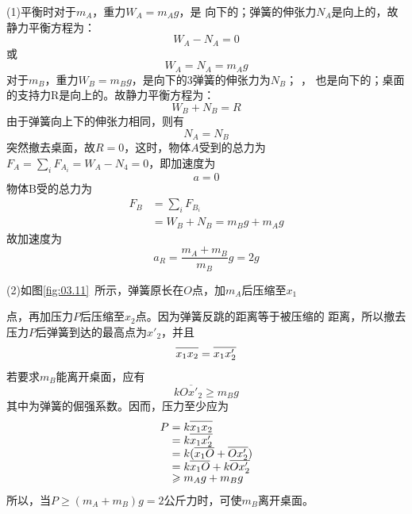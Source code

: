 \solution (1)平衡时对于$ m_A $，重力$ W _ { A } = m _ { A } g $，是
向下的；弹簧的伸张力$ N _ { A } $是向上的，故静力平衡方程为：\vspace{-0.5em}
\begin{equation*}
	W _ { A } - N _ { A } = 0
\end{equation*}
或\vspace{-1.56em}
\begin{equation*}
	W _ { A } = N _ { A } = m _ { A } g
\end{equation*}
对于$ m_B $，重力$ W _ { B } = m _ { B } g $，是向下的3弹簧的伸张力为$ N _ { B } $； ，
也是向下的；桌面的支持力R是向上的。故静力平衡方程为：
\begin{equation*}
	W _ { B } + N _ { B } = R
\end{equation*}
由于弹簧向上下的伸张力相同，则有
\begin{equation*}
	N _ { A } = N _ { B }
\end{equation*}
突然撤去桌面，故$  R = 0  $，这时，物体$ A $受到的总力为$  F _ { A } =
\sum _ i F _ { A _ i } = W _ { A } - N _ { 4 } = 0  $，即加速度为
\begin{equation*}
	a = 0
\end{equation*}
物体B受的总力为
\begin{align*}
	F _ { B } &= \sum _ i F _ { B _ i } \\
		&= W _ { B } + N _ { B } = m _ { B } g + m _ { A } g
\end{align*}
故加速度为
\begin{equation*}
	a _ { R } = \frac { m _ { A } + m _ { B } } { m _ { B } } g = 2 g
\end{equation*}

(2)如图\ref{fig:03.11}~所示，弹簧原长在$ O $点，加$ m_{A} $后压缩至$ x_{1} $

\noindent 点，再加压力$ P $后压缩至$ x_{2} $点。因为弹簧反跳的距离等于被压缩的
距离，所以撤去压力$ P $后弹簧到达的最高点为$  x'_ { 2 }  $，并且
\begin{equation*}
	\overline{ x _ { 1 } x _ { 2 } \llap{\phantom{'}} } = \overline{ x _ { 1 } x' _ { 2 }}
\end{equation*}
若要求$ m_B $能离开桌面，应有
\begin{equation*}
	k \overline{ O x' _ { 2 } } \geqslant m _ { B } g
\end{equation*}
其中为弹簧的倔强系数。因而，压力至少应为
\begin{align*}
	P &= k \overline{ x _ { 1 } x _ { 2 } \llap{\phantom{'}}} \\[-0.5em]
	  &= k \overline{ x _ { 1 } x ' _ { 2 } } \\[-0.5em]
	  &= k ( \overline{ x _ { 1 } O \llap{\phantom{'}} } + \overline{ O x ' _ { 2 } } ) \\[-0.5em]
	  &= k \overline { x _ { 1 } O \llap{\phantom{'}}} + k \overline { O x '_2} \\[-0.5em]
	  &\geqslant m _ { A } g + m _ { B } g
\end{align*}
所以，当$  P \geqslant ( m _ { A } + m _ { B } ) g = 2 \text{公斤力} $时，可使$ m_{B} $离开桌面。

